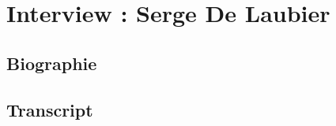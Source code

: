 \chapter{Interview : Serge De Laubier}
\label{appendix:delaubier}

\section*{Biographie}


\section*{Transcript}
